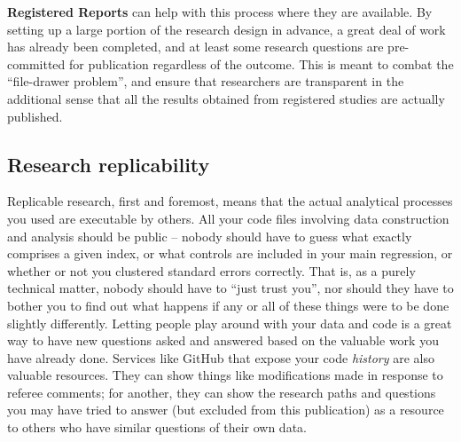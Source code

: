 \textbf{Registered Reports} can help with this process where they are available.
By setting up a large portion of the research design in advance,
a great deal of work has already been completed,
and at least some research questions are pre-committed for publication regardless of the outcome.
This is meant to combat the ``file-drawer problem'',\cite{simonsohn2014p}
and ensure that researchers are transparent in the additional sense that
all the results obtained from registered studies are actually published.

\subsection{Research replicability}

Replicable research, first and foremost,
means that the actual analytical processes you used are executable by others.\cite{dafoe2014science}
All 
your code files involving data construction and analysis
should be public -- nobody should have to guess what exactly comprises a given index,
or what controls are included in your main regression,
or whether or not you clustered standard errors correctly.
That is, as a purely technical matter, nobody should have to ``just trust you'',
nor should they have to bother you to find out what happens
if any or all of these things were to be done slightly differently.\cite{simmons2011false,wicherts2016degrees}
Letting people play around with your data and code is a great way to have new questions asked and answered
based on the valuable work you have already done.
Services like GitHub that expose your code \textit{history}
are also valuable resources. They can show things like modifications
made in response to referee comments; for another, they can show
the research paths and questions you may have tried to answer
(but excluded from this publication)
as a resource to others who have similar questions of their own data.

